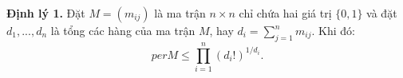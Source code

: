 \documentclass[a4paper, 12pt]{report}
\begin{document}
%
%
%





\textbf{Định lý 1.}  Đặt $M = (m_{ij})$ là ma trận $n \times n$ chỉ chứa hai giá trị $\{0,1\}$ và đặt $d_{1},...,d_{n}$  là tổng các hàng của ma trận $M$, hay $d_{i} =  \displaystyle \sum _{j=1}^{n}m_{ij}$. Khi đó:
\begin{equation*}
    per M \leq \prod_{i=1}^{n}(d_{i}!)^{1/d_{i}}.
\end{equation*}
\end{document}
